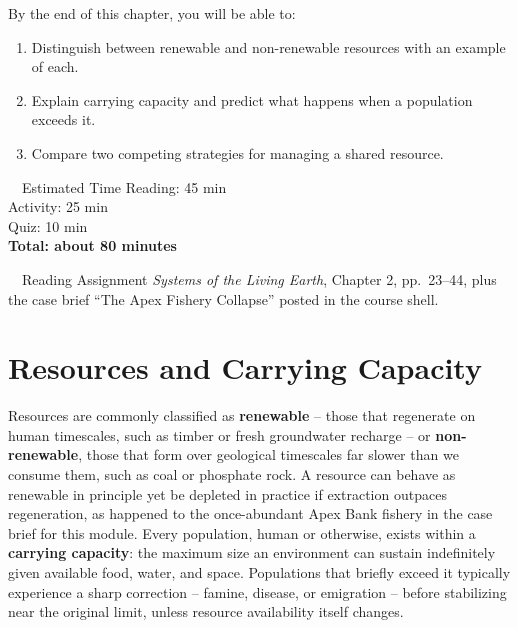 \documentclass[11pt,a4paper]{scrreprt}
\begin{document}
\begin{objectivesbox}
By the end of this chapter, you will be able to:
\begin{enumerate}[label=\arabic*.]
  \item Distinguish between renewable and non-renewable resources with an example of each.
  \item Explain carrying capacity and predict what happens when a population exceeds it.
  \item Compare two competing strategies for managing a shared resource.
\end{enumerate}
\end{objectivesbox}

\begin{center}
\begin{minipage}{0.47\textwidth}
\begin{infobox}{\faClock\ \ Estimated Time}
Reading: 45 min\\
Activity: 25 min\\
Quiz: 10 min\\
\textbf{Total: about 80 minutes}
\end{infobox}
\end{minipage}\hfill
\begin{minipage}{0.47\textwidth}
\begin{infobox}{\faBook\ \ Reading Assignment}
\emph{Systems of the Living Earth}, Chapter 2, pp.\ 23--44, plus the case brief
``The Apex Fishery Collapse'' posted in the course shell.
\end{infobox}
\end{minipage}
\end{center}

\section{Resources and Carrying Capacity}

Resources are commonly classified as \textbf{renewable} -- those that regenerate on human
timescales, such as timber or fresh groundwater recharge -- or \textbf{non-renewable}, those that
form over geological timescales far slower than we consume them, such as coal or phosphate rock. A
resource can behave as renewable in principle yet be depleted in practice if extraction outpaces
regeneration, as happened to the once-abundant Apex Bank fishery in the case brief for this
module. Every population, human or otherwise, exists within a \textbf{carrying capacity}: the
maximum size an environment can sustain indefinitely given available food, water, and space.
Populations that briefly exceed it typically experience a sharp correction -- famine, disease, or
emigration -- before stabilizing near the original limit, unless resource availability itself changes.
\end{document}

